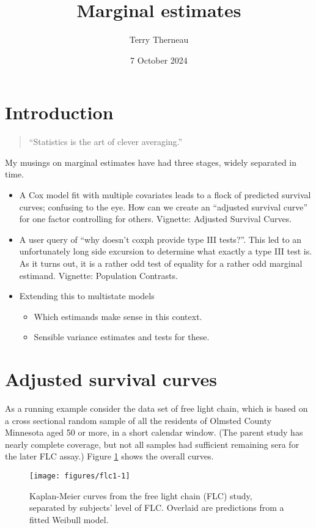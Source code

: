 \documentclass{article}\usepackage[]{graphicx}\usepackage[]{xcolor}
\title{Marginal estimates}
\author{Terry Therneau}
\date{7 October 2024}
\makeatletter
\def\maxwidth{ %
  \ifdim\Gin@nat@width>\linewidth
    \linewidth
  \else
    \Gin@nat@width
  \fi
}
\newenvironment{knitrout}{}{} %
\makeatother
\begin{document}
\maketitle



\section{Introduction}
\begin{quote} ``Statistics is the art of clever averaging.''
\end{quote}

My musings on marginal estimates have had three stages, widely separated in
time.
\begin{itemize}
  \item A Cox model fit with multiple covariates leads to a flock of
    predicted survival curves; confusing to the eye.
    How can we create an ``adjusted survival curve'' for one factor
    controlling for others.  Vignette: Adjusted Survival Curves.
  \item A user query of ``why doesn't coxph provide type III tests?''. 
    This led to an unfortunately long side excursion to determine what exactly
    a type III test is. As it turns out, it is a rather odd test of equality for 
    a rather odd marginal estimand. Vignette: Population Contrasts. 
  \item Extending this to multistate models
    \begin{itemize} 
      \item Which estimands make sense in this context.
      \item Sensible variance estimates and tests for these.
    \end{itemize}
\end{itemize}


\section{Adjusted survival curves}
As a running example consider the data set of free light chain,
which is based on a cross sectional random sample of all the residents of
Olmsted County Minnesota aged 50 or more, in a short calendar window.
(The parent study has nearly complete coverage, but not all samples had
sufficient remaining sera for the later FLC assay.)
Figure \ref{flc1} shows the overall curves.

\begin{figure}
\begin{knitrout}
\color{fgcolor}
\texttt{[image: figures/flc1-1]} 
\end{knitrout}
  \caption{Kaplan-Meier curves from the free light chain (FLC) study, separated by subjects'
    level of FLC. Overlaid are predictions from a
    fitted Weibull model.}
  \label{flc1}
\end{figure}
\end{document}
